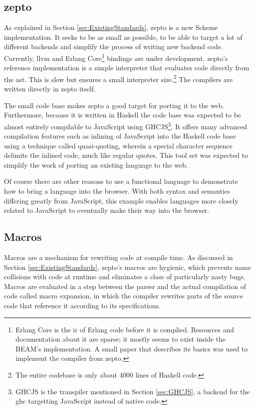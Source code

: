 \documentclass[oneside,11pt,xetex]{scrbook}
\begin{document}
\subsection{zepto}
\label{ququ}

As explained in Section \ref{sec:ExistingStandards}, zepto is a new Scheme implementation. It seeks
to be as small as possible, to be able to target a lot of different backends and simplify the
process of writing new backend code. Currently, \gls{llvm} and Erlang Core\footnote{Erlang Core 
is the \gls{ir} of Erlang code before it is complied. Resources and documentation
about it are sparse; it mostly seems to exist inside the BEAM's implementation. A small
paper \parencite{ERL} that describes its basics was used to implement the compiler from
zepto.} bindings are under development. zepto's reference implementation is a simple interpreter
that evaluates code directly from the \gls{ast}. This is slow but ensures a small
interpreter size.\footnote{The entire codebase is only about 4000 lines of Haskell code.}
The compilers are written directly in zepto itself.

The small code base makes zepto a good target for porting it to the web. Furthermore, because
it is written in Haskell the code base was expected to be almost entirely compilable
to JavaScript using GHCJS\footnote{GHCJS is the transpiler mentioned in Section \ref{sec:GHCJS},
a backend for the \gls{ghc} targetting JavaScript instead of native code.}. It offers many
advanced compilation features such as inlining of JavaScript into the Haskell code
base using a technique called quasi-quoting, wherein a special character sequence delimits the
inlined code, much like regular quotes. This tool set was expected to simplify the work of
porting an existing language to the web.

Of course there are other reasons to use a functional language to demonstrate how to
bring a language into the browser. With both syntax
and semantics differing greatly from JavaScript, this example enables languages more
closely related to JavaScript to eventually make their way into the browser.

\subsection{Macros}
\label{macro}

Macros are a mechanism for rewriting code at compile time. As discussed in
Section \ref{sec:ExistingStandards}, zepto's macros are hygienic, which prevents name collisions
with code at runtime and eliminates a class of particularly nasty bugs. Macros are
evaluated in a step between the parser and the actual compilation of code
called macro expansion, in which the compiler rewrites parts of the source code that reference
it according to its specifications.
\end{document}

